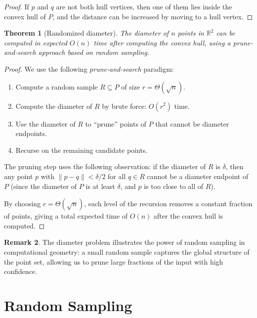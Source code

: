 \documentclass[twoside,12pt]{book}
\theoremstyle{plain}
\newtheorem{theorem}{Theorem}[chapter]
\theoremstyle{definition}
\newtheorem{remark}[theorem]{Remark}
\theoremstyle{remark}
\begin{document}
\begin{proof}
If $p$ and $q$ are not both hull vertices, then one of them lies inside the convex hull of $P$, and the distance can be increased by moving to a hull vertex.
\end{proof}

\begin{theorem}[Randomized diameter]
\label{thm:diameter-rand}
The diameter of $n$ points in $\mathbb{R}^2$ can be computed in expected $O(n)$ time after computing the convex hull, using a prune-and-search approach based on random sampling.
\end{theorem}

\begin{proof}
We use the following \emph{prune-and-search} paradigm:

\begin{enumerate}[nosep]
    \item Compute a random sample $R \subseteq P$ of size $r = \Theta(\sqrt{n})$.
    \item Compute the diameter of $R$ by brute force: $O(r^2)$ time.
    \item Use the diameter of $R$ to ``prune'' points of $P$ that cannot be diameter endpoints.
    \item Recurse on the remaining candidate points.
\end{enumerate}

The pruning step uses the following observation: if the diameter of $R$ is $\delta$, then any point $p$ with $\|p - q\| < \delta/2$ for all $q \in R$ cannot be a diameter endpoint of $P$ (since the diameter of $P$ is at least $\delta$, and $p$ is too close to all of $R$).

By choosing $r = \Theta(\sqrt{n})$, each level of the recursion removes a constant fraction of points, giving a total expected time of $O(n)$ after the convex hull is computed.
\end{proof}

\begin{remark}
The diameter problem illustrates the power of random sampling in computational geometry: a small random sample captures the global structure of the point set, allowing us to prune large fractions of the input with high confidence.
\end{remark}

\section{Random Sampling}
\label{sec:sampling}
\end{document}
